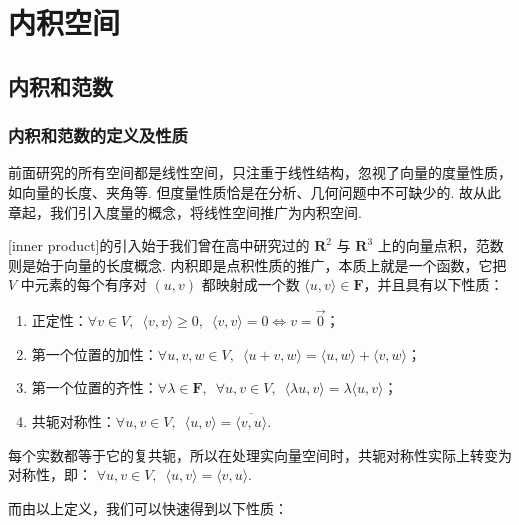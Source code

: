 \chapter{内积空间}

\section{内积和范数}
\subsection{内积和范数的定义及性质}
前面研究的所有空间都是线性空间，只注重于线性结构，忽视了向量的度量性质，如向量的长度、夹角等.
但度量性质恰是在分析、几何问题中不可缺少的. 故从此章起，我们引入度量的概念，将线性空间推广为内积空间.

\vspace{2ex}

[inner product]的引入始于我们曾在高中研究过的 $\mathbf{R}^{2}$ 与 $\mathbf{R}^{3}$ 上的向量点积，范数则是始于向量的长度概念.
内积即是点积性质的推广，本质上就是一个函数，它把 $ V $ 中元素的每个有序对 $(u, v)$ 都映射成一个数
$ \langle u, v \rangle \in \mathbf{F}$，并且具有以下性质：

\begin{enumerate}
    \item 正定性：$\forall v \in V, \enspace \langle v, v \rangle \geqslant 0, \enspace \langle v, v \rangle = 0 \iff v = \vec{0}$；

    \item 第一个位置的加性：$\forall u, v, w \in V, \enspace \langle u + v, w \rangle = \langle u, w \rangle + \langle v, w \rangle$；

    \item 第一个位置的齐性：$\forall \lambda \in \mathbf{F}, \enspace \forall u, v \in V,
          \enspace \langle \lambda u, v \rangle = \lambda \langle u, v \rangle$；

    \item 共轭对称性：$\forall u, v \in V, \enspace \langle u, v \rangle = \overline{\langle v, u \rangle}$.
\end{enumerate}

每个实数都等于它的复共轭，所以在处理实向量空间时，共轭对称性实际上转变为对称性，即：
$\forall u, v \in V, \enspace \langle u, v \rangle = \langle v, u \rangle$.

而由以上定义，我们可以快速得到以下性质：

